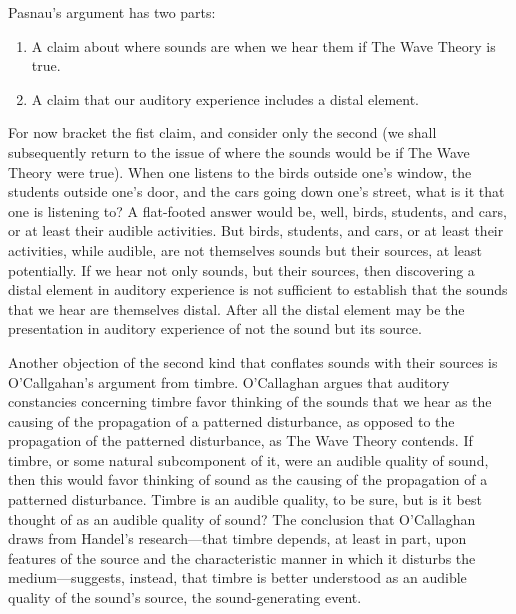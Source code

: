 \documentclass[12pt]{article}
\begin{document}
Pasnau's argument has two parts:
\begin{enumerate}
	\item A claim about where sounds are when we hear them if The Wave Theory is true.
	\item A claim that our auditory experience includes a distal element.
\end{enumerate}
For now bracket the fist claim, and consider only the second (we shall subsequently return to the issue of where the sounds would be if The Wave Theory were true). When one listens to the birds outside one’s window, the students outside one’s door, and the cars going down one’s street, what is it that one is listening to? A flat-footed answer would be, well, birds, students, and cars, or at least their audible activities. But birds, students, and cars, or at least their activities, while audible, are not themselves sounds but their sources, at least potentially. If we hear not only sounds, but their sources, then discovering a distal element in auditory experience is not sufficient to establish that the sounds that we hear are themselves distal. After all the distal element may be the presentation in auditory experience of not the sound but its source.

Another objection of the second kind that conflates sounds with their sources is O’Callgahan’s \citeyearpar[89]{OCallaghan:2007xy} argument from timbre. O’Callaghan argues that auditory constancies concerning timbre favor thinking of the sounds that we hear as the causing of the propagation of a patterned disturbance, as opposed to the propagation of the patterned disturbance, as The Wave Theory contends. If timbre, or some natural subcomponent of it, were an audible quality of sound, then this would favor thinking of sound as the causing of the propagation of a patterned disturbance. Timbre is an audible quality, to be sure, but is it best thought of as an audible quality of sound? The conclusion that O’Callaghan draws from Handel’s research---that timbre depends, at least in part, upon features of the source and the characteristic manner in which it disturbs the medium---suggests, instead, that timbre is better understood as an audible quality of the sound’s source, the sound-generating event.
\end{document}
